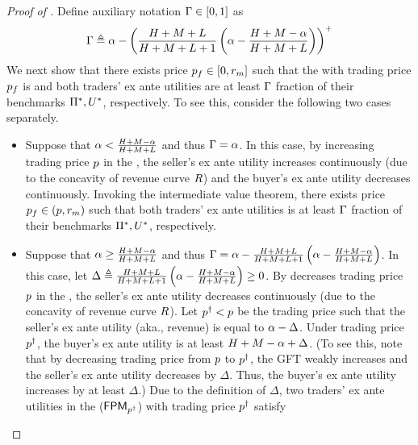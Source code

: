 \begin{proof}[Proof of ]
     Define auxiliary notation $\Gamma\in[0, 1]$ as 
    \begin{align*}
        \Gamma \triangleq \displaystyle
        \alpha - \left( \frac{H + M + L}{H + M + L + 1}\left(\alpha - \frac{H + M - \alpha}{H + M + L}\right) \right)^+
    \end{align*}
    We next show that there exists price $p_f\in[0,r_m]$ such that the {\FixPrice} with trading price $p_f$ is {\ksfair} and both traders' ex ante utilities are at least $\Gamma$ fraction of their benchmarks $\Pi^*,U^*$, respectively. To see this, consider the following two cases separately.
    \begin{itemize}
        \item Suppose that $\alpha < \frac{H + M - \alpha}{H + M + L}$ and thus $\Gamma = \alpha$. In this case, by increasing trading price $p$ in the {\FixPrice}, the seller's ex ante utility increases continuously (due to the concavity of revenue curve $R$) and the buyer's ex ante utility decreases continuously. Invoking the intermediate value theorem, there exists price $p_f \in (p, r_m)$ such that both traders' ex ante utilities is at least $\Gamma$ fraction of their benchmarks $\Pi^*,U^*$, respectively.
        \item Suppose that $\alpha \geq \frac{H + M - \alpha}{H + M + L}$ and thus $\Gamma = \alpha - {\frac{H + M + L}{H + M + L + 1}\left(\alpha - \frac{H + M - \alpha}{H + M + L}\right)}$. In this case, let $\Delta \triangleq {\frac{H + M + L}{H + M + L + 1}\left(\alpha- \frac{H + M - \alpha}{H + M + L}\right)}\geq 0$. By decreases trading price $p$ in the {\FixPrice}, the seller's ex ante utility decreases continuously (due to the concavity of revenue curve $R$). Let $p^\dagger < p$ be the trading price such that the seller's ex ante   utility (aka., revenue) is equal to $\alpha - \Delta$. Under trading price $p^\dagger$, the buyer's ex ante utility is at least $H + M - \alpha + \Delta$. (To see this, note that by decreasing trading price from $p$ to $p^\dagger$, the GFT weakly increases and the seller's ex ante utility decreases by $\Delta$. Thus, the buyer's ex ante utility increases by at least $\Delta$.) Due to the definition of $\Delta$, two traders' ex ante utilities in the {\FixPrice} (${\sf FPM}_{p^\dagger}$) with trading price $p^\dagger$ satisfy

\end{itemize}
\end{proof}
